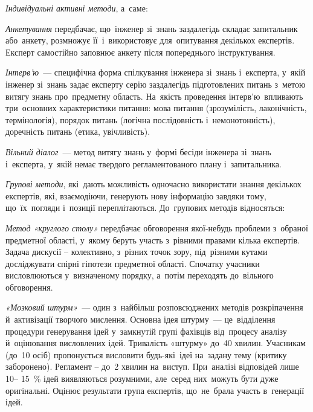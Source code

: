 \documentclass[
  a4paper,
  oneside,
  BCOR = 10mm,
  DIV = 12,
  12pt,
  headings = normal,
]{scrartcl}
\begin{document}
\begin{hangenumerate}[leftmargin=0em]
\begin{hangenumerate}[leftmargin=0em]
              \begin{hangenumerate}
                \item \emph{Індивідуальні активні методи}, а~саме:
                  \begin{hangenumerate}
                    \item \emph{Анкетування} передбачає, що~інженер зі~знань заздалегідь складає запитальник або~анкету, розмножує її~і~використовує для~опитування декількох експертів. Експерт самостійно заповнює анкету після попереднього інструктування.
                    \item \emph{Інтерв'ю}~— специфічна форма спілкування інженера зі~знань і~експерта, у~якій інженер зі~знань задає експерту серію заздалегідь підготовлених питань з~метою витягу знань про~предметну область. На~якість проведення інтерв'ю~впливають три~основних характеристики питання: мова питання (зрозумілість, лаконічність, термінологія), порядок питань (логічна послідовність і~немонотонність), доречність питань (етика, увічливість).
                    \item \emph{Вільний діалог}~— метод витягу знань у~формі бесіди інженера зі~знань і~експерта, у~якій немає твердого регламентованого плану і~запитальника.
                  \end{hangenumerate}
                \item \emph{Групові методи}, які~дають можливість одночасно використати знання декількох експертів, які, взаємодіючи, генерують нову інформацію завдяки тому, що~їх~погляди і~позиції переплітаються. До~групових методів відносяться:
                  \begin{hangenumerate}
                    \item \emph{Метод «круглого столу»} передбачає обговорення якої-небудь проблеми з~обраної предметної області, у~якому беруть участь з~рівними правами кілька експертів. Задача дискусії – колективно, з~різних точок зору, під~різними кутами досліджувати спірні гіпотези предметної області.  Спочатку учасники висловлюються у~визначеному порядку, а~потім переходять до~вільного обговорення.
                    \item \emph{«Мозковий штурм»}~— один з~найбільш розповсюджених методів розкріпачення й~активізації творчого мислення. Основна ідея штурму~— це~відділення процедури генерування ідей у~замкнутій групі фахівців від~процесу аналізу й~оцінювання висловлених ідей. Тривалість «штурму» до~40 хвилин. Учасникам (до~10 осіб) пропонується висловити будь-які~ідеї на~задану тему (критику заборонено). Регламент – до~2 хвилин на~виступ. При~аналізі відповідей лише 10– 15~\% ідей виявляються розумними, але~серед них~можуть бути дуже оригінальні. Оцінює результати група експертів, що~не~брала участь в~генерації ідей.

\end{hangenumerate}
\end{hangenumerate}
\end{hangenumerate}
\end{hangenumerate}
\end{document}
